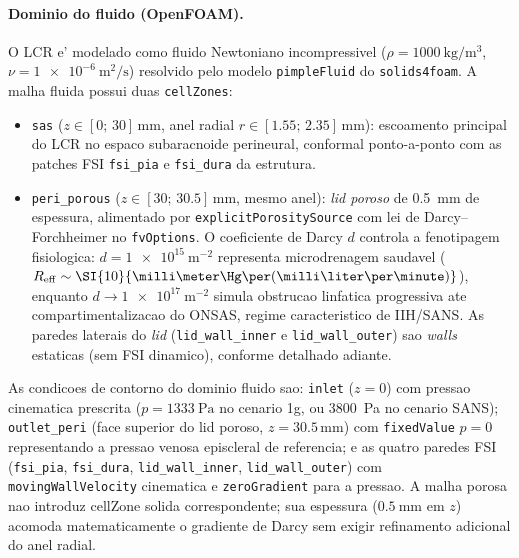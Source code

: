 \paragraph{Dominio do fluido (OpenFOAM).} O LCR e' modelado como fluido Newtoniano incompressivel ($\rho = \SI{1000}{\kilogram\per\meter\cubed}$, $\nu = \SI{1e-6}{\square\meter\per\second}$) resolvido pelo modelo \texttt{pimpleFluid} do \texttt{solids4foam}. A malha fluida possui duas \texttt{cellZones}:
\begin{itemize}
  \item \texttt{sas} ($z \in [0;\, 30]\,\si{\milli\meter}$, anel radial $r \in [1.55;\, 2.35]\,\si{\milli\meter}$): escoamento principal do LCR no espaco subaracnoide perineural, conformal ponto-a-ponto com as patches FSI \texttt{fsi\_pia} e \texttt{fsi\_dura} da estrutura.
  \item \texttt{peri\_porous} ($z \in [30;\, 30.5]\,\si{\milli\meter}$, mesmo anel): \emph{lid poroso} de \SI{0.5}{\milli\meter} de espessura, alimentado por \texttt{explicitPorositySource} com lei de Darcy--Forchheimer no \texttt{fvOptions}. O coeficiente de Darcy $d$ controla a fenotipagem fisiologica: $d = \SI{1e15}{\meter^{-2}}$ representa microdrenagem saudavel ($R_{\mathrm{eff}} \sim \SI{10}{\milli\meter\Hg\per(\milli\liter\per\minute)}$), enquanto $d \rightarrow \SI{1e17}{\meter^{-2}}$ simula obstrucao linfatica progressiva ate compartimentalizacao do ONSAS, regime caracteristico de IIH/SANS. As paredes laterais do \emph{lid} (\texttt{lid\_wall\_inner} e \texttt{lid\_wall\_outer}) sao \emph{walls} estaticas (sem FSI dinamico), conforme detalhado adiante.
\end{itemize}
As condicoes de contorno do dominio fluido sao: \texttt{inlet} ($z = 0$) com pressao cinematica prescrita ($p = \SI{1333}{\pascal}$ no cenario 1g, ou \SI{3800}{\pascal} no cenario SANS); \texttt{outlet\_peri} (face superior do lid poroso, $z = 30.5\,\si{\milli\meter}$) com \texttt{fixedValue} $p = 0$ representando a pressao venosa episcleral de referencia; e as quatro paredes FSI (\texttt{fsi\_pia}, \texttt{fsi\_dura}, \texttt{lid\_wall\_inner}, \texttt{lid\_wall\_outer}) com \texttt{movingWallVelocity} cinematica e \texttt{zeroGradient} para a pressao. A malha porosa nao introduz cellZone solida correspondente; sua espessura ($\SI{0.5}{\milli\meter}$ em $z$) acomoda matematicamente o gradiente de Darcy sem exigir refinamento adicional do anel radial.

